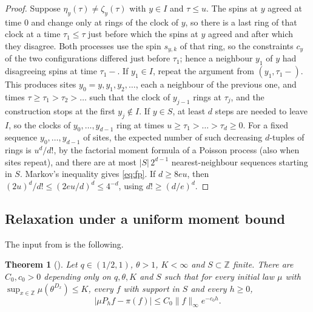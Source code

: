 \documentclass[11pt]{amsart}
\newtheorem{theorem}{Theorem}[section]
\theoremstyle{remark}
\newcommand{\Z}{\mathbb{Z}}
\begin{document}
\begin{proof}
Suppose $\eta_y(\tau)\ne\zeta_y(\tau)$ with $y\in I$ and $\tau\le u$. The spins at $y$ agreed at time $0$ and change only at
rings of the clock of $y$, so there is a last ring of that clock at a time $\tau_1\le\tau$ just before which the spins at
$y$ agreed and after which they disagree. Both processes use the spin $s_{y,k}$ of that ring, so the constraints
$c_y$ of the two configurations differed just before $\tau_1$; hence a neighbour $y_1$ of $y$ had disagreeing spins
at time $\tau_1-$. If $y_1\in I$, repeat the argument from $(y_1,\tau_1-)$. This produces sites $y_0=y,y_1,y_2,\dots$, each a
neighbour of the previous one, and times $\tau\ge\tau_1>\tau_2>\dots$ such that the clock of $y_{j-1}$ rings at
$\tau_j$, and
the construction stops at the first $y_j\notin I$. If $y\in S$, at least $d$ steps are needed to leave $I$, so the
clocks of $y_0,\dots,y_{d-1}$ ring at times $u\ge\tau_1>\dots>\tau_d\ge0$. For a fixed sequence $y_0,\dots,y_{d-1}$ of
sites, the expected number of such decreasing $d$-tuples of rings is $u^d/d!$, by the factorial moment formula of a
Poisson process (also when sites repeat), and there are at most $|S|\,2^{d-1}$ nearest-neighbour sequences starting
in $S$. Markov's inequality gives \eqref{eq:fp}. If $d\ge8eu$, then $(2u)^d/d!\le(2eu/d)^d\le4^{-d}$, using
$d!\ge(d/e)^d$.
\end{proof}

\subsection{Relaxation under a uniform moment bound}
The input from \cite{BCMRT13} is the following.

\begin{theorem}[{\cite[Theorem~2.1]{BCMRT13}}]\label{thm:bcmrt}
Let $q\in(1/2,1)$, $\theta>1$, $K<\infty$ and $S\subset\Z$ finite. There are $C_0,c_0>0$ depending only on
$q,\theta,K$ and $S$ such that for every initial law $\mu$ with $\sup_{x\in\Z}\mu(\theta^{D_x})\le K$, every $f$
with support in $S$ and every $h\ge0$,
\begin{equation}\label{eq:bcmrt}
|\mu P_hf-\pi(f)|\le C_0\|f\|_\infty e^{-c_0h}.
\end{equation}
\end{theorem}
\end{document}
